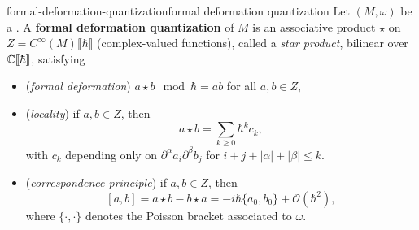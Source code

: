 \begin{topic}{formal-deformation-quantization}{formal deformation quantization}
    Let $(M, \omega)$ be a . A \textbf{formal deformation quantization} of $M$ is an associative product $\star$ on $Z = C^\infty(M) \llbracket \hbar \rrbracket$ (complex-valued functions), called a \textit{star product}, bilinear over $\mathbb{C} \llbracket \hbar \rrbracket$, satisfying
    \begin{itemize}
        \item (\textit{formal deformation}) $a \star b \mod \hbar = ab$ for all $a, b \in Z$,
        \item (\textit{locality}) if $a, b \in Z$, then
        \[ a \star b = \sum_{k \ge 0} \hbar^k c_k , \]
        with $c_k$ depending only on $\partial^\alpha a_i \partial^\beta b_j$ for $i + j + |\alpha| + |\beta| \le k$.
        \item (\textit{correspondence principle}) if $a, b \in Z$, then
        \[ [a, b] = a \star b - b \star a = - i \hbar \{ a_0, b_0 \} + \mathcal{O}(\hbar^2) , \]
        where $\{ \cdot, \cdot \}$ denotes the Poisson bracket associated to $\omega$.
    \end{itemize}
\end{topic}